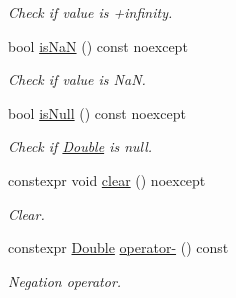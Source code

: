 \begin{DoxyCompactItemize}
\begin{DoxyCompactList}\small\item\em Check if value is +infinity. \end{DoxyCompactList}\item 
bool \hyperlink{class_mdt_1_1_numeric_1_1_double_a2cc3d131c3558fc7d6b494c439e2f826}{is\+NaN} () const noexcept
\begin{DoxyCompactList}\small\item\em Check if value is NaN. \end{DoxyCompactList}\item 
bool \hyperlink{class_mdt_1_1_numeric_1_1_double_a01d4bfdb780a56d84fa07f48282aa254}{is\+Null} () const noexcept
\begin{DoxyCompactList}\small\item\em Check if \hyperlink{class_mdt_1_1_numeric_1_1_double}{Double} is null. \end{DoxyCompactList}\item 
constexpr void \hyperlink{class_mdt_1_1_numeric_1_1_double_a0306258c3934f174cbe9826f129e705a}{clear} () noexcept\hypertarget{class_mdt_1_1_numeric_1_1_double_a0306258c3934f174cbe9826f129e705a}{}\label{class_mdt_1_1_numeric_1_1_double_a0306258c3934f174cbe9826f129e705a}

\begin{DoxyCompactList}\small\item\em Clear. \end{DoxyCompactList}\item 
constexpr \hyperlink{class_mdt_1_1_numeric_1_1_double}{Double} \hyperlink{class_mdt_1_1_numeric_1_1_double_a833b6f2ba91fee3158b2e5eba5a978dc}{operator-\/} () const 
\begin{DoxyCompactList}\small\item\em Negation operator. \end{DoxyCompactList}\end{DoxyCompactItemize}
